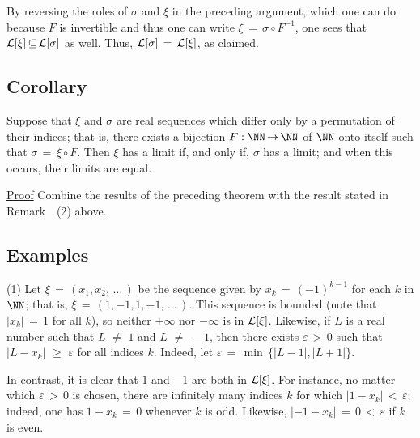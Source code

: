         By reversing the roles of ${\sigma}$ and ${\xi}$ in the preceding argument,
    which one can do because $F$ is invertible and thus one can write ${\xi} \,=\, {\sigma}{\circ}F^{-1}$,
    one sees that ${\cal L}[{\xi}] \,{\subseteq}\, {\cal L}[{\sigma}]$ as well.
    Thus, ${\cal L}[{\sigma}] \,=\, {\cal L}[{\xi}]$, as claimed.

\V
            \subsection{\small{\bf Corollary}}
            \label{CorC50.120}

        Suppose that ${\xi}$ and ${\sigma}$ are real sequences which differ only by a permutation of their indices;
    that is, there exists a bijection $F:{\NN} \,{\rightarrow}\, {\NN}$ of ${\NN}$ onto itself such that ${\sigma} \,=\, {\xi}{\circ}F$.
    Then ${\xi}$ has a limit if, and only if, ${\sigma}$ has a limit; and when this occurs, their limits are equal.

\V

        \underline{Proof} Combine the results of the preceding theorem with the result stated in Remark~~(2) above.

\V
\V


            \subsection{\small{\bf Examples}}
            \label{ExampC50.130}

        \hspace*{\parindent}(1) Let ${\xi} \,=\, (x_{1},x_{2},\,{\ldots}\,)$ be the sequence given by $x_{k} \,=\, (-1)^{k-1}$ for each $k$ in ${\NN}$;
    that is, ${\xi} \,=\, (1,-1,1,-1,\,{\ldots}\,)$.
    This sequence is bounded (note that $|x_{k}| \,=\, 1$ for all $k$), so neither $+{\infty}$ nor $-{\infty}$ is in ${\cal L}[{\xi}]$.
    Likewise, if $L$ is a real number such that $L \,\,{\neq}\,\, 1$ and $L \,\,{\neq}\,\, -1$,
    then there exists ${\varepsilon}\,>\,0$ such that $|L-x_{k}|\,\,{\geq}\,\,{\varepsilon}$ for all indices $k$.
    Indeed, let ${\varepsilon} \,=\, \min\,\{|L-1|,|L+1|\}$.

        In contrast, it is clear that $1$ and $-1$ are both in ${\cal L}[{\xi}]$.
    For instance, no matter which ${\varepsilon}\,>\,0$ is chosen, there are infinitely many indices $k$ for which $|1-x_{k}|\,<\,{\varepsilon}$;
    indeed, one has $1-x_{k} \,=\, 0$ whenever $k$ is odd.
    Likewise, $|-1-x_{k}| \,=\, 0\,<\,{\varepsilon}$ if $k$ is even.

